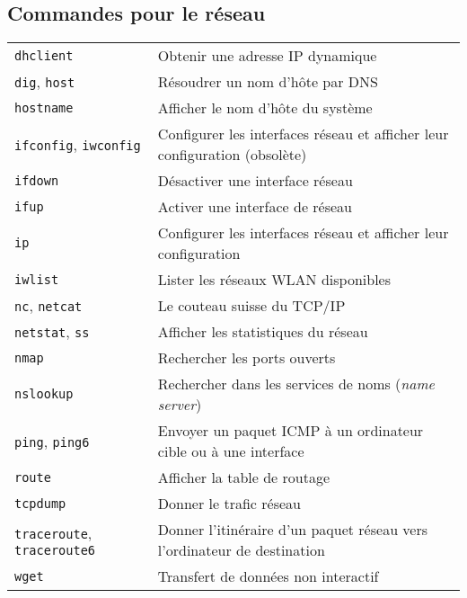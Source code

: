 \documentclass[10pt,a4paper]{article}
\begin{document}
\begin{multicols}{2}

\section{Commandes pour le réseau}
\begin{tabular}{ p{2.5cm} p{8.5cm} }
  \hline
  \texttt{dhclient} & Obtenir une adresse IP dynamique \\
  \rowcolor{Gray}
  \texttt{dig}, \texttt{host} & Résoudrer un nom d'hôte par DNS \\
  \texttt{hostname} & Afficher le nom d'hôte du système \\
  \rowcolor{Gray}
  \texttt{ifconfig}, \texttt{iwconfig} & Configurer les interfaces réseau et afficher leur confi\-guration (obsolète)\\
  \texttt{ifdown} & Désactiver une interface réseau \\
  \rowcolor{Gray}
  \texttt{ifup} & Activer une interface de réseau\\
  \texttt{ip} & Configurer les interfaces réseau et afficher leur confi\-guration\\
  \rowcolor{Gray}
  \texttt{iwlist} & Lister les réseaux WLAN disponibles\\
  \texttt{nc}, \texttt{netcat} & Le couteau suisse du TCP/IP \\
  \rowcolor{Gray}
  \texttt{netstat}, \texttt{ss} & Afficher les statistiques du réseau \\
  \texttt{nmap} & Rechercher les ports ouverts \\
  \rowcolor{Gray}
  \texttt{nslookup} & Rechercher dans les services de noms (\textit{name server}) \\
  \texttt{ping}, \texttt{ping6} & Envoyer un paquet ICMP à un ordinateur cible ou à une interface\\
  \rowcolor{Gray}
  \texttt{route} & Afficher la table de routage \\
  \texttt{tcpdump} & Donner le trafic réseau \\
  \rowcolor{Gray}
  \texttt{traceroute}, \texttt{traceroute6} & Donner l'itinéraire d'un paquet réseau vers \newline l'ordinateur de destination \\
  \texttt{wget} & Transfert de données non interactif \\
  \hline
\end{tabular}

\hfill
~ \\


\end{multicols}
\end{document}
